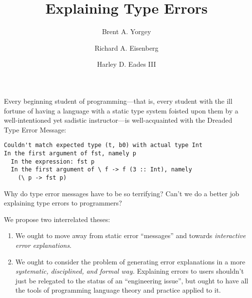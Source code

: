 \documentclass[sigplan, screen]{acmart}\settopmatter{printccs=false,printacmref=false}
\begin{document}
\title{Explaining Type Errors}

\author{Brent A. Yorgey}

\author{Richard A. Eisenberg}

\author{Harley D. Eades III}



\maketitle

Every beginning student of programming---that is, every student with
the ill fortune of having a language with a static type system foisted
upon them by a well-intentioned yet sadistic instructor---is
well-acquainted with the Dreaded Type Error Message:
\begin{verbatim}
Couldn't match expected type (t, b0) with actual type Int
In the first argument of fst, namely p
  In the expression: fst p
  In the first argument of \ f -> f (3 :: Int), namely
    (\ p -> fst p)
\end{verbatim}
Why do type error messages have to be so terrifying?  Can't we do a
better job explaining type errors to programmers?

We propose two interrelated theses:
\begin{enumerate}
\item We ought to move away from static error ``messages'' and towards
  \emph{interactive error explanations}.
\item We ought to consider the problem of generating error
  explanations in a more \emph{systematic, disciplined, and formal way.}
  Explaining errors to users shouldn't just be relegated to the status
  of an ``engineering issue'', but ought to have all the tools of
  programming language theory and practice applied to it.
\end{enumerate}
\end{document}
